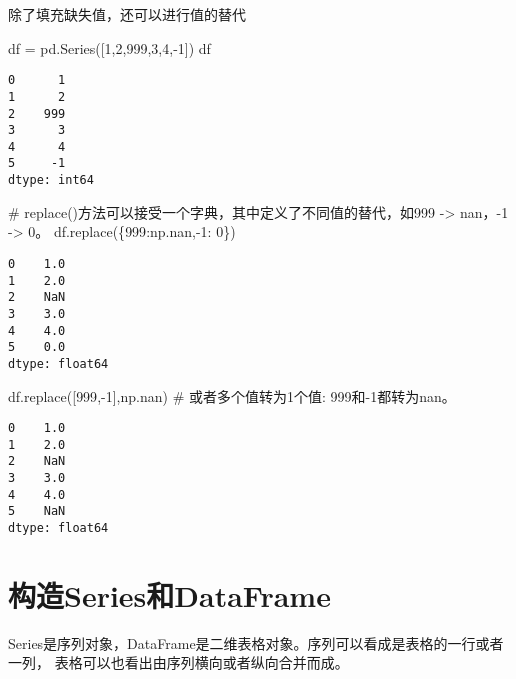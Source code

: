 \documentclass[
  letterpaper,
  DIV=11,
  numbers=noendperiod]{scrreprt}
\newenvironment{Shaded}{\begin{snugshade}}{\end{snugshade}}
\newcommand{\CommentTok}[1]{\textcolor[rgb]{0.37,0.37,0.37}{#1}}
\newcommand{\DecValTok}[1]{\textcolor[rgb]{0.68,0.00,0.00}{#1}}
\newcommand{\NormalTok}[1]{\textcolor[rgb]{0.00,0.23,0.31}{#1}}
\newcommand{\OperatorTok}[1]{\textcolor[rgb]{0.37,0.37,0.37}{#1}}
\begin{document}
除了填充缺失值，还可以进行值的替代

\begin{Shaded}
\begin{Highlighting}[]
\NormalTok{df }\OperatorTok{=}\NormalTok{ pd.Series([}\DecValTok{1}\NormalTok{,}\DecValTok{2}\NormalTok{,}\DecValTok{999}\NormalTok{,}\DecValTok{3}\NormalTok{,}\DecValTok{4}\NormalTok{,}\OperatorTok{{-}}\DecValTok{1}\NormalTok{])}
\NormalTok{df}
\end{Highlighting}
\end{Shaded}

\begin{verbatim}
0      1
1      2
2    999
3      3
4      4
5     -1
dtype: int64
\end{verbatim}

\begin{Shaded}
\begin{Highlighting}[]
\CommentTok{\# replace()方法可以接受一个字典，其中定义了不同值的替代，如999 {-}\textgreater{} nan，{-}1 {-}\textgreater{} 0。}
\NormalTok{df.replace(\{}\DecValTok{999}\NormalTok{:np.nan,}\OperatorTok{{-}}\DecValTok{1}\NormalTok{: }\DecValTok{0}\NormalTok{\})}
\end{Highlighting}
\end{Shaded}

\begin{verbatim}
0    1.0
1    2.0
2    NaN
3    3.0
4    4.0
5    0.0
dtype: float64
\end{verbatim}

\begin{Shaded}
\begin{Highlighting}[]
\NormalTok{df.replace([}\DecValTok{999}\NormalTok{,}\OperatorTok{{-}}\DecValTok{1}\NormalTok{],np.nan) }\CommentTok{\# 或者多个值转为1个值: 999和{-}1都转为nan。}
\end{Highlighting}
\end{Shaded}

\begin{verbatim}
0    1.0
1    2.0
2    NaN
3    3.0
4    4.0
5    NaN
dtype: float64
\end{verbatim}

\hypertarget{ux6784ux9020seriesux548cdataframe}{%
\section{构造Series和DataFrame}\label{ux6784ux9020seriesux548cdataframe}}

Series是序列对象，DataFrame是二维表格对象。序列可以看成是表格的一行或者一列，
表格可以也看出由序列横向或者纵向合并而成。
\end{document}
